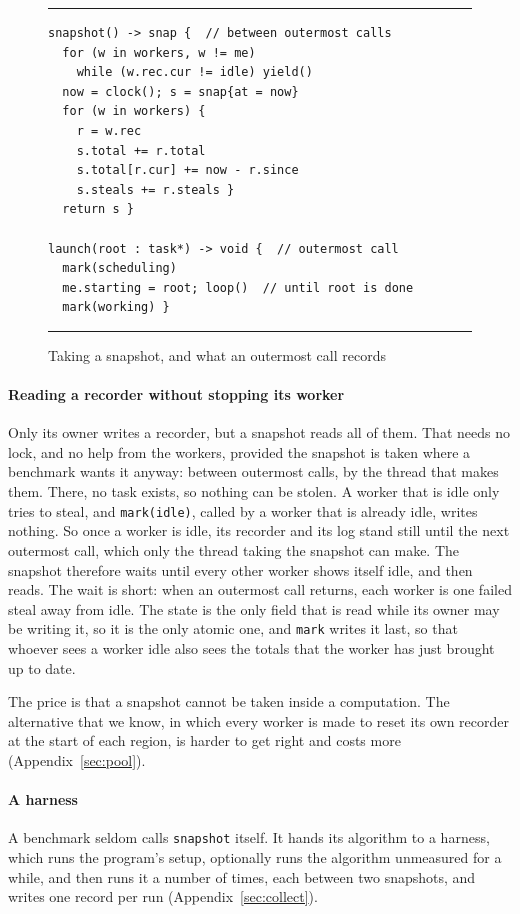 \documentclass[sigplan,nonacm]{acmart}
\begin{document}
\begin{figure}
\hrule
\begin{lstlisting}
snapshot() -> snap {  // between outermost calls
  for (w in workers, w != me)
    while (w.rec.cur != idle) yield()
  now = clock(); s = snap{at = now}
  for (w in workers) {
    r = w.rec
    s.total += r.total
    s.total[r.cur] += now - r.since
    s.steals += r.steals }
  return s }

launch(root : task*) -> void {  // outermost call
  mark(scheduling)
  me.starting = root; loop()  // until root is done
  mark(working) }
\end{lstlisting}
\hrule
\caption{Taking a snapshot, and what an outermost call records}
\label{fig:snapshot}
\end{figure}

\paragraph{Reading a recorder without stopping its worker}
%
Only its owner writes a recorder, but a snapshot reads all of them.
%
That needs no lock, and no help from the workers, provided the
snapshot is taken where a benchmark wants it anyway: between outermost
calls, by the thread that makes them.
%
There, no task exists, so nothing can be stolen.
%
A worker that is idle only tries to steal, and
\lstinline|mark(idle)|, called by a worker that is already idle,
writes nothing.
%
So once a worker is idle, its recorder and its log stand still until
the next outermost call, which only the thread taking the snapshot can
make.
%
The snapshot therefore waits until every other worker shows itself
idle, and then reads.
%
The wait is short: when an outermost call returns, each worker is one
failed steal away from idle.
%
The state is the only field that is read while its owner may be
writing it, so it is the only atomic one, and \lstinline|mark| writes
it last, so that whoever sees a worker idle also sees the totals that
the worker has just brought up to date.

The price is that a snapshot cannot be taken inside a computation.
%
The alternative that we know, in which every worker is made to reset
its own recorder at the start of each region, is harder to get right
and costs more (Appendix~\ref{sec:pool}).

\paragraph{A harness}
%
A benchmark seldom calls \lstinline|snapshot| itself.
%
It hands its algorithm to a harness, which runs the program's setup,
optionally runs the algorithm unmeasured for a while, and then runs it
a number of times, each between two snapshots, and writes one record
per run (Appendix~\ref{sec:collect}).
\end{document}

